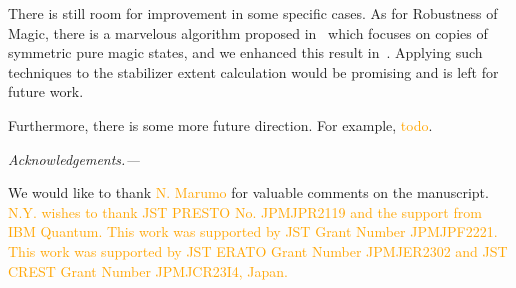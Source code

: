 \documentclass[a4paper, onecolumn, 11pt, longbibliography]{quantumarticle}
\newcommand{\orange}[1]{\textcolor{orange}{#1}}
\begin{document}
There is still room for improvement
in some specific cases.
As for Robustness of Magic,
there is a marvelous algorithm
proposed in~\cite{Heinrich2019robustnessofmagic}
which focuses on copies of symmetric pure magic states,
and we enhanced this result in~\cite{hamaguchiHandbookEfficientlyQuantifying2023}.
Applying such techniques to the stabilizer extent calculation
would be promising and is left for future work.

Furthermore, there is some more future direction.
For example, \orange{todo}.

\emph{Acknowledgements.---}

We would like to thank \orange{N. Marumo} for valuable comments on the manuscript.
\orange{N.Y. wishes to thank JST PRESTO No. JPMJPR2119 and the support
    from IBM Quantum. This work was supported by JST Grant Number JPMJPF2221.
    This work was supported by JST ERATO Grant Number JPMJER2302 and JST CREST
    Grant Number JPMJCR23I4, Japan.}




\appendix




\end{document}
